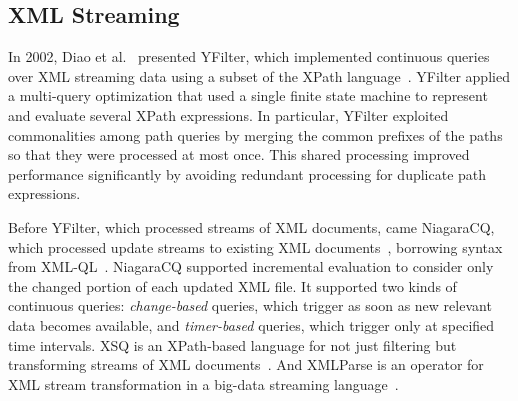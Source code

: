 \subsection{XML Streaming}\label{sec:xml} %

In 2002, Diao et al.~\cite{diao_et_al_2002,diao2003high} presented
\textsf{YFilter}, which implemented continuous queries over XML
streaming data using a subset of the XPath
language~\cite{clark_derose_1999}. YFilter applied a multi-query
optimization that used a single finite state machine to represent and
evaluate several XPath expressions. In particular, YFilter exploited
commonalities among path queries by merging the common prefixes of
the paths so that they were processed at most once. This shared
processing improved performance significantly by
avoiding redundant processing for duplicate path expressions.  \iffalse To
handle value-based predicates that address contents of elements,
YFilter applied two alternative approa\-ches. The first approach
evaluates the predicates once the addressed elements are read from a
document, while the second approach postpones predicate evaluation
until the corresponding path expression has been entirely matched.\fi

Before YFilter, which processed streams of XML documents, came
\textsf{NiagaraCQ}, which processed update streams to existing XML
documents~\cite{chen_et_al_2000}, borrowing syntax from
XML-QL~\cite{deutsch1999query}.  NiagaraCQ supported incremental
evaluation to consider only the changed portion of each updated XML
file. It supported two kinds of continuous queries:
\emph{change-based} queries, which trigger as soon as new relevant
data becomes available, and \emph{timer-based} queries, which trigger
only at specified time intervals. \textsf{XSQ} is an XPath-based
language for not just filtering but transforming streams of XML
documents~\cite{peng_chawathe_2003}. And \textsf{XMLParse} is an
operator for XML stream transformation in a big-data streaming
language~\cite{mendell_et_al_2012}.
